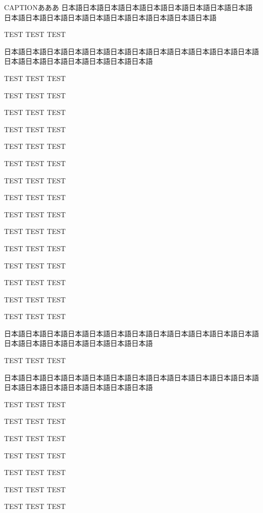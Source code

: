 \begin{rv@marker@caption}{CAPTIONあああ}
日本語日本語日本語日本語日本語日本語日本語日本語日本語日本語日本語日本語日本語日本語日本語日本語日本語日本語日本語

TEST TEST TEST

\end{rv@marker@caption}

\begin{rv@marker@nocaption}[rv marker markchar={?}]
日本語日本語日本語日本語日本語日本語日本語日本語日本語日本語日本語日本語日本語日本語日本語日本語日本語日本語日本語

TEST TEST TEST

TEST TEST TEST

TEST TEST TEST

TEST TEST TEST

TEST TEST TEST

TEST TEST TEST

TEST TEST TEST

TEST TEST TEST

TEST TEST TEST

TEST TEST TEST

TEST TEST TEST

TEST TEST TEST

TEST TEST TEST

TEST TEST TEST

TEST TEST TEST

\end{rv@marker@nocaption}

\clearpage

\begin{rv@outerarcbox@nocaption}
日本語日本語日本語日本語日本語日本語日本語日本語日本語日本語日本語日本語日本語日本語日本語日本語日本語日本語日本語

TEST TEST TEST

\end{rv@outerarcbox@nocaption}

\begin{rv@outerarcbox@nocaption}
日本語日本語日本語日本語日本語日本語日本語日本語日本語日本語日本語日本語日本語日本語日本語日本語日本語日本語日本語

TEST TEST TEST

TEST TEST TEST

TEST TEST TEST

TEST TEST TEST

TEST TEST TEST

TEST TEST TEST

TEST TEST TEST

\end{rv@outerarcbox@nocaption}

